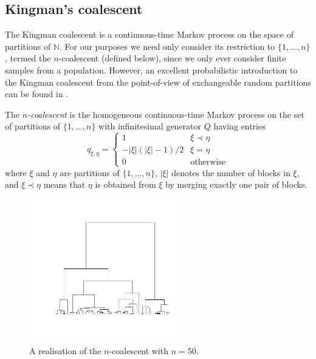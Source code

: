\subsection{Kingman's coalescent}
The Kingman coalescent \parencite{kingman1982gene, kingman1982coal, kingman1982exch} is a continuous-time Markov process on the space of partitions of $\mathbb{N}$. For our purposes we need only consider its restriction to $\{1,\dots,n\}$, termed the $n$-coalescent (defined below), since we only ever consider finite samples from a population. 
However, an excellent probabilistic introduction to the Kingman coalescent from the point-of-view of exchangeable random partitions can be found in \textcite[Chapters 1--2]{berestycki2009}. 
\begin{defn}%
\label{def:kingman}
The \emph{$n$-coalescent} is the homogeneous continuous-time Markov process on the set of partitions of $\{1,\dots,n\}$ with infinitesimal generator $Q$ having entries
\begin{equation}\label{eq:KCgenerator}
q_{\xi,\eta} = \begin{cases}
1 & \xi \prec \eta\\
-|\xi|(|\xi|-1)/2 & \xi=\eta \\
0 & \text{otherwise}
\end{cases}
\end{equation}
where $\xi$ and $\eta$ are partitions of $\{1,...,n\}$, $|\xi|$ denotes the number of blocks in $\xi$, and $\xi \prec \eta$ means that $\eta$ is obtained from $\xi$ by merging exactly one pair of blocks.
\end{defn}

\begin{figure}
\centering
\includegraphics[width=0.6\textwidth, trim={2.8cm 3cm 1.5cm 2cm}, clip]{plots/ncoalescent.pdf}
\caption[The $n$-coalescent]{A realisation of the $n$-coalescent with $n=50$.}
\end{figure}

